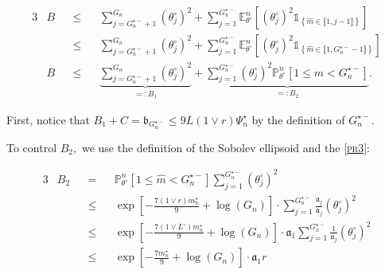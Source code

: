 \begin{alignat*}{3}
& B && \leq && \sum\limits_{j = G_{n}^{\star-} + 1}^{G_{n}} \left(\theta^{\circ}_{j}\right)^{2} + \sum\limits_{j = 1}^{G_{n}^{\star-}} \mathds{E}_{\theta^{\circ}}^{n}\left[\left(\theta^{\circ}_{j}\right)^{2} \mathds{1}_{\left\{\widehat{m} \in \llbracket 1, j - 1 \rrbracket\right\}}\right]\\
& && \leq && \sum\limits_{j = G_{n}^{\star-} + 1}^{G_{n}} \left(\theta^{\circ}_{j}\right)^{2} + \sum\limits_{j = 1}^{G_{n}^{\star-}} \mathds{E}_{\theta^{\circ}}^{n}\left[\left(\theta^{\circ}_{j}\right)^{2} \mathds{1}_{\left\{\widehat{m} \in \llbracket 1, G_{n}^{\star-} - 1 \rrbracket\right\}}\right]\\
& B && \leq && \underbrace{\sum\limits_{j = G_{n}^{\star-} + 1}^{G_{n}} \left(\theta^{\circ}_{j}\right)^{2}}_{=: B_{1}} + \underbrace{\sum\limits_{j = 1}^{G_{n}^{\star-}} \left(\theta^{\circ}_{j}\right)^{2} \mathds{P}_{\theta^{\circ}}^{n}\left[1 \leq \widehat{m} < G_{n}^{\star-}\right]}_{=: B_{2}}.
\end{alignat*}

\medskip

First, notice that $B_{1} + C = \mathfrak{b}_{G_{n}^{\star-}} \leq 9 L \left(1 \vee r\right) \Psi_{n}^{\star}$ by the definition of $G_{n}^{\star-}.$

\medskip

To control $B_{2},$ we use the definition of the Sobolev ellipsoid and the \textsc{\cref{pr3}}:
 
\begin{alignat*}{3}
& B_{2} && = && \mathds{P}_{\theta^{\circ}}^{n}\left[1 \leq \widehat{m} < G_{n}^{\star-}\right] \sum\limits_{j = 1}^{G_{n}^{\star-}} \left(\theta^{\circ}_{j}\right)^{2} \\
& && \leq && \exp\left[-\frac{7 \left(1 \vee r\right) m_{n}^{\star}}{9} + \log\left(G_{n}\right)\right] \cdot \sum\limits_{j = 1}^{G_{n}^{\star-}} \frac{\mathfrak{a}_{j}}{\mathfrak{a}_{j}}\left(\theta^{\circ}_{j}\right)^{2}\\
& && \leq && \exp\left[-\frac{7 \left(1 \vee L^{\circ} \right) m_{n}^{\star}}{9} + \log\left(G_{n}\right)\right] \cdot \mathfrak{a}_{1}\sum\limits_{j = 1}^{G_{n}^{\star-}} \frac{1}{\mathfrak{a}_{j}}\left(\theta^{\circ}_{j}\right)^{2}\\
& && \leq && \exp\left[-\frac{7 m_{n}^{\star}}{9} + \log\left(G_{n}\right)\right] \cdot \mathfrak{a}_{1}r\\
 \end{alignat*}

